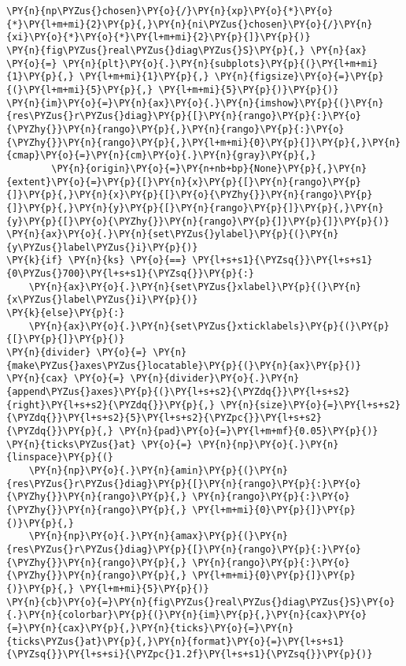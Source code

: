\begin{Verbatim}[commandchars=\\\{\}]
                            \PY{n}{np\PYZus{}chosen}\PY{o}{/}\PY{n}{xp}\PY{o}{*}\PY{o}{*}\PY{l+m+mi}{2}\PY{p}{,}\PY{n}{ni\PYZus{}chosen}\PY{o}{/}\PY{n}{xi}\PY{o}{*}\PY{o}{*}\PY{l+m+mi}{2}\PY{p}{]}\PY{p}{)}
\PY{n}{fig\PYZus{}real\PYZus{}diag\PYZus{}S}\PY{p}{,} \PY{n}{ax} \PY{o}{=} \PY{n}{plt}\PY{o}{.}\PY{n}{subplots}\PY{p}{(}\PY{l+m+mi}{1}\PY{p}{,} \PY{l+m+mi}{1}\PY{p}{,} \PY{n}{figsize}\PY{o}{=}\PY{p}{(}\PY{l+m+mi}{5}\PY{p}{,} \PY{l+m+mi}{5}\PY{p}{)}\PY{p}{)}
\PY{n}{im}\PY{o}{=}\PY{n}{ax}\PY{o}{.}\PY{n}{imshow}\PY{p}{(}\PY{n}{res\PYZus{}r\PYZus{}diag}\PY{p}{[}\PY{n}{rango}\PY{p}{:}\PY{o}{\PYZhy{}}\PY{n}{rango}\PY{p}{,}\PY{n}{rango}\PY{p}{:}\PY{o}{\PYZhy{}}\PY{n}{rango}\PY{p}{,}\PY{l+m+mi}{0}\PY{p}{]}\PY{p}{,}\PY{n}{cmap}\PY{o}{=}\PY{n}{cm}\PY{o}{.}\PY{n}{gray}\PY{p}{,}
        \PY{n}{origin}\PY{o}{=}\PY{n+nb+bp}{None}\PY{p}{,}\PY{n}{extent}\PY{o}{=}\PY{p}{[}\PY{n}{x}\PY{p}{[}\PY{n}{rango}\PY{p}{]}\PY{p}{,}\PY{n}{x}\PY{p}{[}\PY{o}{\PYZhy{}}\PY{n}{rango}\PY{p}{]}\PY{p}{,}\PY{n}{y}\PY{p}{[}\PY{n}{rango}\PY{p}{]}\PY{p}{,}\PY{n}{y}\PY{p}{[}\PY{o}{\PYZhy{}}\PY{n}{rango}\PY{p}{]}\PY{p}{]}\PY{p}{)}
\PY{n}{ax}\PY{o}{.}\PY{n}{set\PYZus{}ylabel}\PY{p}{(}\PY{n}{y\PYZus{}label\PYZus{}i}\PY{p}{)}
\PY{k}{if} \PY{n}{ks} \PY{o}{==} \PY{l+s+s1}{\PYZsq{}}\PY{l+s+s1}{0\PYZus{}700}\PY{l+s+s1}{\PYZsq{}}\PY{p}{:}
    \PY{n}{ax}\PY{o}{.}\PY{n}{set\PYZus{}xlabel}\PY{p}{(}\PY{n}{x\PYZus{}label\PYZus{}i}\PY{p}{)}
\PY{k}{else}\PY{p}{:}
    \PY{n}{ax}\PY{o}{.}\PY{n}{set\PYZus{}xticklabels}\PY{p}{(}\PY{p}{[}\PY{p}{]}\PY{p}{)}
\PY{n}{divider} \PY{o}{=} \PY{n}{make\PYZus{}axes\PYZus{}locatable}\PY{p}{(}\PY{n}{ax}\PY{p}{)}
\PY{n}{cax} \PY{o}{=} \PY{n}{divider}\PY{o}{.}\PY{n}{append\PYZus{}axes}\PY{p}{(}\PY{l+s+s2}{\PYZdq{}}\PY{l+s+s2}{right}\PY{l+s+s2}{\PYZdq{}}\PY{p}{,} \PY{n}{size}\PY{o}{=}\PY{l+s+s2}{\PYZdq{}}\PY{l+s+s2}{5}\PY{l+s+s2}{\PYZpc{}}\PY{l+s+s2}{\PYZdq{}}\PY{p}{,} \PY{n}{pad}\PY{o}{=}\PY{l+m+mf}{0.05}\PY{p}{)}
\PY{n}{ticks\PYZus{}at} \PY{o}{=} \PY{n}{np}\PY{o}{.}\PY{n}{linspace}\PY{p}{(}
    \PY{n}{np}\PY{o}{.}\PY{n}{amin}\PY{p}{(}\PY{n}{res\PYZus{}r\PYZus{}diag}\PY{p}{[}\PY{n}{rango}\PY{p}{:}\PY{o}{\PYZhy{}}\PY{n}{rango}\PY{p}{,} \PY{n}{rango}\PY{p}{:}\PY{o}{\PYZhy{}}\PY{n}{rango}\PY{p}{,} \PY{l+m+mi}{0}\PY{p}{]}\PY{p}{)}\PY{p}{,}
    \PY{n}{np}\PY{o}{.}\PY{n}{amax}\PY{p}{(}\PY{n}{res\PYZus{}r\PYZus{}diag}\PY{p}{[}\PY{n}{rango}\PY{p}{:}\PY{o}{\PYZhy{}}\PY{n}{rango}\PY{p}{,} \PY{n}{rango}\PY{p}{:}\PY{o}{\PYZhy{}}\PY{n}{rango}\PY{p}{,} \PY{l+m+mi}{0}\PY{p}{]}\PY{p}{)}\PY{p}{,} \PY{l+m+mi}{5}\PY{p}{)}
\PY{n}{cb}\PY{o}{=}\PY{n}{fig\PYZus{}real\PYZus{}diag\PYZus{}S}\PY{o}{.}\PY{n}{colorbar}\PY{p}{(}\PY{n}{im}\PY{p}{,}\PY{n}{cax}\PY{o}{=}\PY{n}{cax}\PY{p}{,}\PY{n}{ticks}\PY{o}{=}\PY{n}{ticks\PYZus{}at}\PY{p}{,}\PY{n}{format}\PY{o}{=}\PY{l+s+s1}{\PYZsq{}}\PY{l+s+si}{\PYZpc{}1.2f}\PY{l+s+s1}{\PYZsq{}}\PY{p}{)}

\end{Verbatim}
